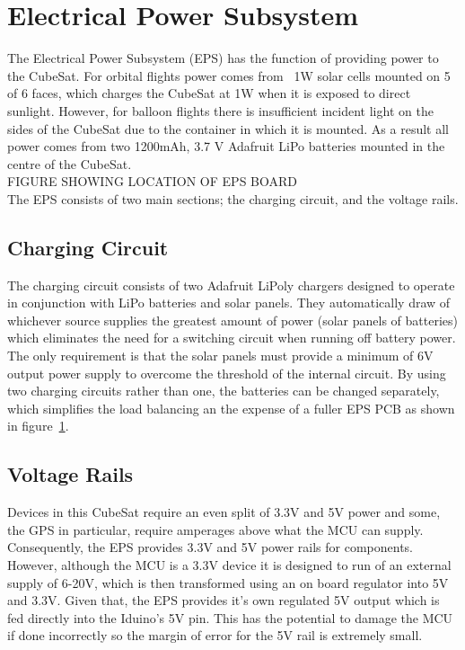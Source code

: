 \section{Electrical Power Subsystem}

The Electrical Power Subsystem (EPS) has the function of providing power to the CubeSat.  For orbital flights power comes from ~1W solar cells mounted on 5 of 6 faces, which charges the CubeSat at 1W when it is exposed to direct sunlight.  However, for balloon flights there is insufficient incident light on the sides of the CubeSat due to the container in which it is mounted.  As a result all power comes from two 1200mAh, 3.7 V Adafruit LiPo batteries mounted in the centre of the CubeSat. \\

FIGURE SHOWING LOCATION OF EPS BOARD \\

The EPS consists of two main sections; the charging circuit, and the voltage rails. \\

\subsection{Charging Circuit}
The charging circuit consists of two Adafruit LiPoly chargers designed to operate in conjunction with LiPo batteries and solar panels.  They automatically draw of whichever source supplies the greatest amount of power (solar panels of batteries) which eliminates the need for a switching circuit when running off battery power.  The only requirement is that the solar panels must provide a minimum of 6V output power supply to overcome the threshold of the internal circuit.  By using two charging circuits rather than one, the batteries can be changed separately, which simplifies the load balancing an the expense of a fuller EPS PCB as shown in figure~\ref{fig:epspcb}.

\begin{figure}[H]
	\label{fig:epspcb}
\end{figure}

\subsection{Voltage Rails}
Devices in this CubeSat require an even split of 3.3V and 5V power and some, the GPS in particular, require amperages above what the MCU can supply.  Consequently, the EPS provides 3.3V and 5V power rails for components.  However, although the MCU is a 3.3V device it is designed to run of an external supply of 6-20V, which is then transformed using an on board regulator into 5V and 3.3V.  Given that, the EPS provides it's own regulated 5V output which is fed directly into the Iduino's 5V pin.  This has the potential to damage the MCU if done incorrectly so the margin of error for the 5V rail is extremely small. \\

